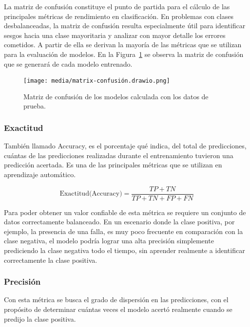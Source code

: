 \documentclass[11pt,a4paper,spanish]{book}
\numberwithin{equation}{chapter}
\numberwithin{figure}{chapter}
\begin{document}
La matriz de confusión constituye el punto de partida para el cálculo de las principales métricas de rendimiento en clasificación. En problemas con clases desbalanceadas, la matriz de confusión resulta especialmente útil para identificar sesgos hacia una clase mayoritaria y analizar con mayor detalle los errores cometidos. A partir de ella se derivan la mayoría de las métricas que se utilizan para la evaluación de modelos. En la Figura~\ref{fig:figMatrixConfusion} se observa la matriz de confusión que se generará de cada modelo entrenado. 



\begin{figure}[h]
    \centering
    \texttt{[image: media/matrix-confusión.drawio.png]}
    \caption{Matriz de confusión de los modelos calculada con los datos de prueba.}
    \label{fig:figMatrixConfusion}
\end{figure}


\subsubsection{Exactitud}

También llamado Accuracy, es el porcentaje qué indica, del total de predicciones, cuántas de las predicciones realizadas durante el entrenamiento tuvieron una predicción acertada. Es una de las principales métricas que se utilizan en aprendizaje automático.

\begin{equation}\label{eq:accuracy}
\text{Exactitud(Accuracy)} = \frac{TP + TN}{TP + TN + FP + FN}
\end{equation}

Para poder obtener un valor confiable de esta métrica se requiere un conjunto de datos correctamente balanceado.  En un escenario donde la clase positiva, por ejemplo, la presencia de una falla, es muy poco frecuente en comparación con la clase negativa, el modelo podría lograr una alta precisión simplemente prediciendo la clase negativa todo el tiempo, sin aprender realmente a identificar correctamente la clase positiva.

\subsubsection{Precisión}

Con esta métrica se busca el grado de dispersión en las predicciones, con el propósito de determinar cuántas veces el modelo acertó realmente cuando se predijo la clase positiva. 
\end{document}
